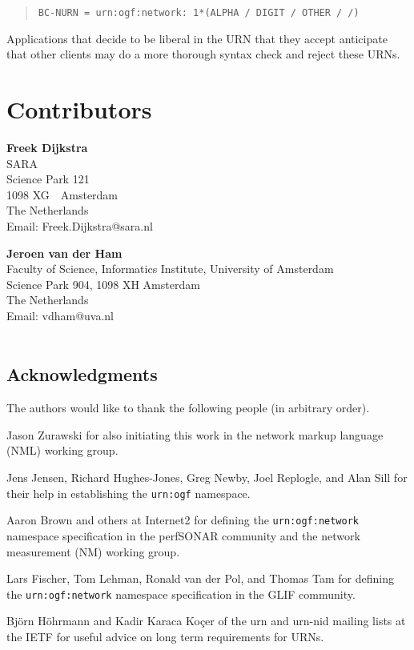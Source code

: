 \documentclass[12pt]{article}  %
\begin{document}
\begin{quote}
  \texttt{BC-NURN = \qq{}urn:ogf:network:\qq{} 1*(ALPHA / DIGIT / OTHER / \qq{}/\qq{})}
\end{quote}

Applications that decide to be liberal in the URN that they accept \MUST{} anticipate that other clients may do a more thorough syntax check and reject these URNs.

\section{Contributors}

\textbf{Freek Dijkstra} \\
SARA \\
Science Park 121 \\
1098 XG\ \  Amsterdam \\
The Netherlands \\
Email: Freek.Dijkstra@sara.nl

\textbf{Jeroen van der Ham} \\
Faculty of Science, Informatics Institute, University of Amsterdam \\
Science Park 904, 1098 XH  Amsterdam  \\
The Netherlands \\
Email: vdham@uva.nl \\
\\

\subsection*{Acknowledgments}

The authors would like to thank the following people (in arbitrary order).

Jason Zurawski for also initiating this work in the network markup language (NML) working group.

Jens Jensen, Richard Hughes-Jones, Greg Newby, Joel Replogle, and Alan Sill for their help in establishing the \texttt{urn:ogf} namespace.

Aaron Brown and others at Internet2 for defining the \texttt{urn:ogf:network} namespace specification in the perfSONAR community and the network measurement (NM) working group.

Lars Fischer, Tom Lehman, Ronald van der Pol, and Thomas Tam for defining the \texttt{urn:ogf:network} namespace specification in the GLIF community.

Björn Höhrmann and Kadir Karaca Koçer of the urn and urn-nid mailing lists at the IETF for useful advice on long term requirements for URNs.
\end{document}
